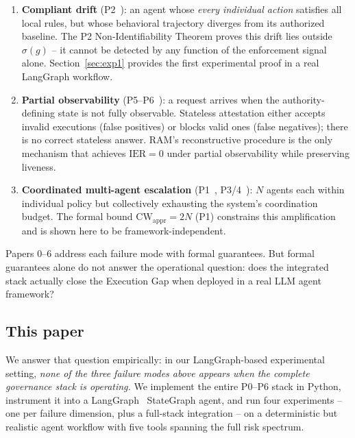 \documentclass[11pt]{article}
\newcommand{\CW}{\mathrm{CW}}
\newcommand{\IER}{\mathrm{IER}}
\begin{document}
\begin{enumerate}[leftmargin=2em, topsep=2pt]
  \item \textbf{Compliant drift} (P2~\cite{fernandez2026iml}): an agent
        whose \emph{every individual action} satisfies all local rules, but
        whose behavioral trajectory diverges from its authorized baseline.
        The P2 Non-Identifiability Theorem proves this drift lies outside
        $\sigma(g)$ -- it cannot be detected by any function of the
        enforcement signal alone.
        Section~\ref{sec:exp1} provides the first experimental proof in a
        real LangGraph workflow.
  \item \textbf{Partial observability} (P5--P6~\cite{fernandez2026ram,fernandez2026opram}):
        a request arrives when the authority-defining state is not fully
        observable. Stateless attestation either accepts invalid executions
        (false positives) or blocks valid ones (false negatives); there is no
        correct stateless answer. RAM's reconstructive procedure is the only
        mechanism that achieves $\IER=0$ under partial observability while
        preserving liveness.
  \item \textbf{Coordinated multi-agent escalation} (P1~\cite{fernandez2026acp},
        P3/4~\cite{fernandez2026govstr}): $N$ agents each within individual
        policy but collectively exhausting the system's coordination budget.
        The formal bound $\CW_{\mathrm{appr}}=2N$ (P1) constrains this
        amplification and is shown here to be framework-independent.
\end{enumerate}

Papers 0--6 address each failure mode with formal guarantees.
But formal guarantees alone do not answer the operational question: does
the integrated stack actually close the Execution Gap when deployed in a
real LLM agent framework?

\subsection*{This paper}

We answer that question empirically: in our LangGraph-based experimental
setting, \emph{none of the three failure modes above appears when the complete
governance stack is operating.}
We implement the entire P0--P6 stack in Python, instrument it into a
LangGraph~\cite{langgraph2024} StateGraph agent, and run four experiments --
one per failure dimension, plus a full-stack integration -- on a deterministic
but realistic agent workflow with five tools spanning the full risk spectrum.
\end{document}
